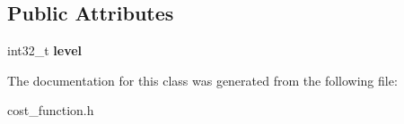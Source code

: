 \subsection*{Public Attributes}
\begin{DoxyCompactItemize}
\item 
\mbox{\label{classsbgen_1_1pcf__function__data__t_ad729698abeced0e091a78f9def6094e3}} 
int32\+\_\+t {\bfseries level}
\end{DoxyCompactItemize}


The documentation for this class was generated from the following file\+:\begin{DoxyCompactItemize}
\item 
cost\+\_\+function.\+h\end{DoxyCompactItemize}
